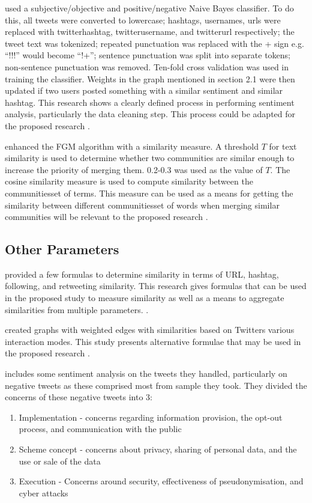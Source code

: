  used a subjective/objective and positive/negative Naive Bayes classifier. To do this, all tweets were converted to lowercase; hashtags, usernames, urls were replaced with twitterhashtag, twitterusername, and twitterurl respectively; the tweet text was tokenized; repeated punctuation was replaced with the + sign e.g. ``!!!'' would become ``!+''; sentence punctuation was split into separate tokens; non-sentence punctuation was removed. Ten-fold cross validation was used in training the classifier. Weights in the graph mentioned in section 2.1 were then updated if two users posted something with a similar sentiment and similar hashtag. This research shows a clearly defined process in performing sentiment analysis, particularly the data cleaning step. This process could be adapted for the proposed research \cite{Deitrick:2013}.

 enhanced the FGM algorithm with a similarity measure. A threshold $T$ for text similarity is used to determine whether two communities are similar enough to increase the priority of merging them. 0.2-0.3 was used as the value of $T$. The cosine similarity measure is used to compute similarity between the communities\vtick set of terms. This measure can be used as a means for getting the similarity between different communities\vtick set of words when merging similar communities will be relevant to the proposed research \cite{Bakillah:2014}.

\subsection{Other Parameters}
 provided a few formulas to determine similarity in terms of URL, hashtag, following, and retweeting similarity. This research gives formulas that can be used in the proposed study to measure similarity as well as a means to aggregate similarities from multiple parameters. \cite{Zhang:2012}. 

 created graphs with weighted edges with similarities based on Twitter\vtick s various interaction modes. This study presents alternative formulae that may be used in the proposed research \cite{Bakillah:2014}.

 includes some sentiment analysis on the tweets they handled, particularly on negative tweets as these comprised most from sample they took. They divided the concerns of these negative tweets into 3:

\begin{enumerate}
	\item Implementation - concerns regarding information provision, the opt-out process, and communication with the public
	\item Scheme concept - concerns about privacy, sharing of personal data, and the use or sale of the data
	\item Execution - Concerns around security, effectiveness of pseudonymisation, and cyber attacks
	
\end{enumerate}

